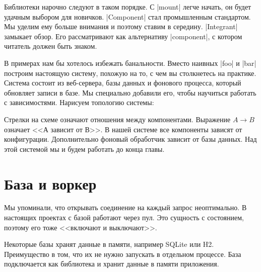 Библиотеки нарочно следуют в таком порядке. С \spverb|mount| легче начать, он
будет удачным выбором для новичков. \spverb|Component| стал промышленным
стандартом. Мы уделим ему больше внимания и поэтому ставим в
середину. \spverb|Integrant| замыкает обзор. Его рассматривают как альтернативу
\spverb|component|, с котором читатель должен быть знаком.

В примерах нам бы хотелось избежать банальности. Вместо наивных \spverb|foo| и
\spverb|bar| построим настоящую систему, похожую на то, с чем вы столкнетесь на
практике. Система состоит из веб-сервера, базы данных и фонового процесса,
который обновляет записи в базе. Мы специально добавили его, чтобы научиться
работать с зависимостями. Нарисуем топологию системы:


\vspace{1em}
\vspace{1em}

Стрелки на схеме означают отношения между компонентами. Выражение $A \to B$
означает <<А зависит от В>>. В нашей системе все компоненты зависят от
конфигурации. Дополнительно фоновый обработчик зависит от базы данных. Над этой
системой мы и будем работать до конца главы.

\section{База и воркер}

Мы упоминали, что открывать соединение на каждый запрос неоптимально. В
настоящих проектах с базой работают через пул. Это сущность с состоянием,
поэтому его тоже <<включают и выключают>>.

Некоторые базы хранят данные в памяти, например SQLite или H2. Преимущество в
том, что их не нужно запускать в отдельном процессе. База подключается как
библиотека и хранит данные в памяти приложения.

